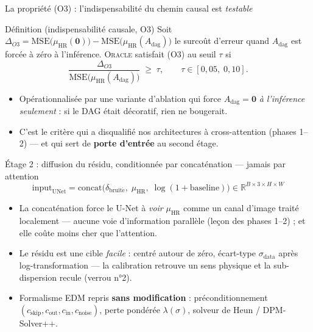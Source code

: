 \documentclass[aspectratio=169,10pt]{beamer}
\newcommand{\Oracle}{\textsc{Oracle}}
\newcommand{\HR}{\mathrm{HR}}
\newcommand{\muHR}{\mu_{\HR}}
\newcommand{\Adag}{A_{\mathrm{dag}}}
\begin{document}
\begin{frame}{La propriété (O3) : l'indispensabilité du chemin causal est \emph{testable}}
  \begin{block}{Définition (indispensabilité causale, O3)}
    Soit $\Delta_{O3} = \mathrm{MSE}\!\big(\muHR(\mathbf{0})\big) - \mathrm{MSE}\!\big(\muHR(\Adag)\big)$
    le surcoût d'erreur quand $\Adag$ est forcée à zéro à l'inférence.
    \Oracle{} satisfait (O3) au seuil $\tau$ si
    \begin{equation*}
      \frac{\Delta_{O3}}{\mathrm{MSE}\!\big(\muHR(\Adag)\big)} \;\geq\; \tau,
      \qquad \tau \in [0{,}05,\; 0{,}10].
    \end{equation*}
  \end{block}
  \vspace{0.15cm}
  \begin{itemize}
    \item Opérationnalisée par une variante d'ablation qui force $\Adag = \mathbf{0}$
          \emph{à l'inférence seulement} : si le DAG était décoratif, rien ne bougerait.
    \item C'est le critère qui a \alert{disqualifié} nos architectures à cross-attention
          (phases 1--2) --- et qui sert de \textbf{porte d'entrée} au second étage.
  \end{itemize}
\end{frame}

\begin{frame}{Étage 2 : diffusion du résidu, conditionnée par concaténation --- jamais par attention}
  \begin{equation*}
    \mathrm{input}_{\mathrm{UNet}} = \mathrm{concat}\!\big( \delta_{\mathrm{bruit\acute{e}}},\; \muHR,\; \log(1+\mathrm{baseline}) \big) \in \mathbb{R}^{B\times 3\times H\times W}
  \end{equation*}
  \begin{itemize}
    \item La concaténation force le U-Net à \emph{voir} $\muHR$ comme un canal d'image
          traité localement --- \alert{aucune voie d'information parallèle} (leçon des
          phases 1--2) ; et elle coûte moins cher que l'attention.
    \item Le résidu est une cible \emph{facile} : centré autour de zéro, écart-type
          $\sigma_{\mathrm{data}}$ après log-transformation --- la calibration retrouve
          un sens physique et la sub-dispersion recule (verrou n°2).
    \item Formalisme EDM repris \textbf{sans modification} : préconditionnement
          $(c_{\mathrm{skip}}, c_{\mathrm{out}}, c_{\mathrm{in}}, c_{\mathrm{noise}})$,
          perte pondérée $\lambda(\sigma)$, solveur de Heun / DPM-Solver++.
  \end{itemize}
\end{frame}
\end{document}
